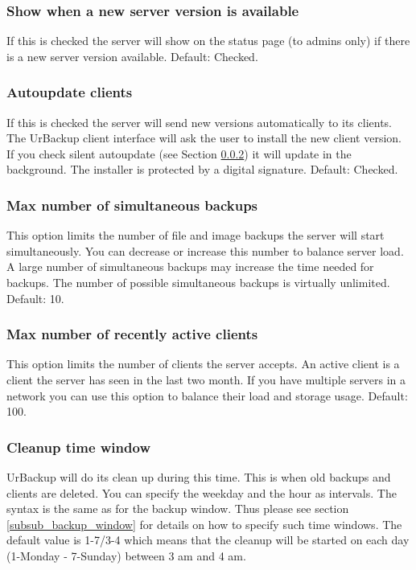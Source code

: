 \documentclass[a4paper,10pt]{article}
\begin{document}
\subsubsection{Show when a new server version is available}

If this is checked the server will show on the status page (to admins only) if there is a new
server version available. Default: Checked.

\subsubsection{Autoupdate clients}
\label{subsubsec:autoupdate}

If this is checked the server will send new versions automatically to its clients.
The UrBackup client interface will ask the user to
install the new client version. If you check silent autoupdate (see Section \ref{subsubsec:autoupdate})
it will update in the background.
The installer is protected by a digital signature. Default: Checked.

\subsubsection{Max number of simultaneous backups}

This option limits the number of file and image backups the server will start
simultaneously. You can decrease or increase this number to balance server load. A
large number of simultaneous backups may increase the time needed for backups.
The number of possible simultaneous backups is virtually unlimited. Default: 10.

\subsubsection{Max number of recently active clients}

This option limits the number of clients the server accepts. An active client is
a client the server has seen in the last two month. If you have multiple servers
in a network you can use this option to balance their load and storage usage.
Default: 100.

\subsubsection{Cleanup time window}

UrBackup will do its clean up during this time. This is when old backups and
clients are deleted. You can specify the weekday and the hour as intervals. The
syntax is the same as for the backup window. Thus please see section
\ref{subsub_backup_window} for details on how to specify such time windows.
The default value is 1-7/3-4 which means that the cleanup will be started on
each day (1-Monday - 7-Sunday) between 3 am and 4 am.
\end{document}
